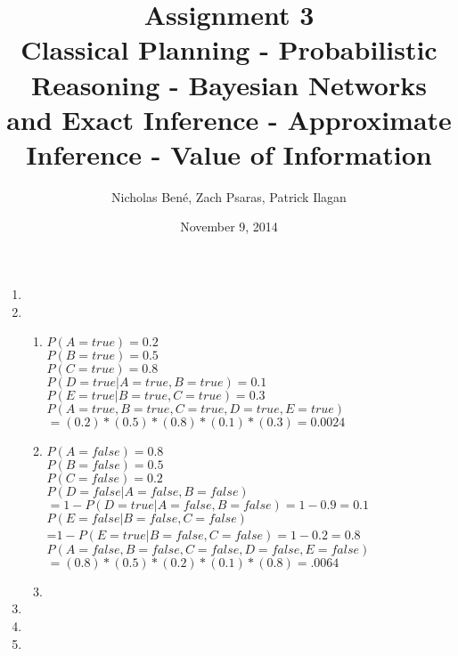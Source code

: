 \documentclass[12pt,a4paper]{report}
\begin{document}
\title{Assignment 3 \\ Classical Planning - Probabilistic Reasoning - Bayesian Networks and Exact Inference - Approximate Inference - Value of Information}

\author{Nicholas Ben\'e, Zach Psaras, Patrick Ilagan}
\date{November 9, 2014}
\maketitle

\begin{enumerate}
	
\item

\item
\begin{enumerate}
	\item
	$P(A=true)=0.2$\\
	$P(B=true)=0.5$\\
	$P(C=true)=0.8$\\
	$P(D=true | A=true, B=true)=0.1$\\
	$P(E=true|B=true, C=true)=0.3$\\
	$P(A=true,B=true,C=true,D=true,E=true)$\\$=(0.2)*(0.5)*(0.8)*(0.1)*(0.3) = 0.0024$
	\item
	$P(A=false)=0.8$\\
	$P(B=false)=0.5$\\
	$P(C=false)=0.2$\\
	$P(D=false|A=false,B=false)$\\$=1-P(D=true|A=false,B=false)=1-0.9=0.1$\\
	$P(E=false|B=false,C=false)$\\=$1-P(E=true|B=false,C=false)=1-0.2=0.8$\\
	$P(A=false, B=false, C=false, D=false, E=false)$\\$=(0.8)*(0.5)*(0.2)*(0.1)*(0.8) = .0064$
	\item
	
\end{enumerate}

\item

\item

\item

\end{enumerate}
\end{document}
